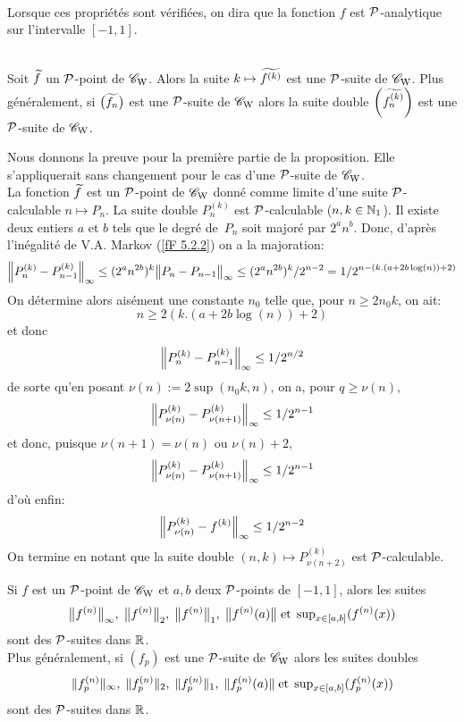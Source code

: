 \begin{fdefinition}  \label{f529} 
~\\ 
Lorsque ces propriétés sont vérifiées, on dira que la fonction $f$ est  
${\cal P}$-analytique sur l'intervalle  $[-1,1]$.
 \end{fdefinition}

\begin{ftheorem} \label{f5210} ~\\
Soit $\widetilde f$ un  ${\cal P}$-point de  ${{{\mathscr C}}_{\rm W}}$.  Alors  la suite $k \mapsto \widetilde{f^{(k)}}$   est  une  ${\cal P}$-suite de  ${{{\mathscr C}}_{\rm W}}$.  
Plus généralement, si $\big(\widetilde{f_n}\big)$ est une ${\cal P}$-suite de  ${{{\mathscr C}}_{\rm W}}$  alors la suite 
double $\bigg(\widetilde{f_n^{(k)}}\bigg)$ est une ${\cal P}$-suite de  ${{{\mathscr C}}_{\rm W}}$.
\end{ftheorem}

\proof Nous donnons la preuve pour la première partie de la proposition. Elle 
s'appliquerait sans changement pour le cas d'une ${\cal P}$-suite de ${{{\mathscr C}}_{\rm W}}$. \\
La fonction $\widetilde f$ est un ${\cal P}$-point de ${{{\mathscr C}}_{\rm W}}$ donné comme limite d'une suite   ${\cal P}$-calculable $n \mapsto P_n$. 
La suite double  $P_n^{(k)}$  est  ${\cal P}$-calculable  ($n,k\in\mathbb {N}_1$).  
Il existe deux entiers  $a$  et  $b$  tels que le degré de~$P_n$ soit majoré par  $2^a n^b$.  
Donc,  d'après l'inégalité de V.A. Markov  (\ref{fF 5.2.2})  on a la majoration:
\[
\Big\lVert  P_n^{(k)} - P_{n-1}^{(k)}  \Big\rVert_\infty \leq (2^an^{2b})^k \big\lVert  P_n - P_{n-1}  \big\rVert_{\infty} \leq (2^an^{2b})^k /2^{n-2} = 1/2^{n-(k.(a+2b \log(n))+2)}
\]
On détermine alors aisément une constante  $n_0$  telle que, pour 
$n \geq 2n_0k$, on ait:   $$n \geq 2(k.(a+2b \log(n))+2)$$ 
et donc  
\[
\Big\lVert  P_n^{(k)} - P_{n-1}^{(k)}  \Big\rVert_\infty \leq 1/2^{n/2}
\] 
de sorte qu'en posant  $\nu(n) := 2 \sup(n_0k,n)$,  on a, pour 
$q \geq \nu(n),$  
\[
\Big\lVert  P_{\nu(n)}^{(k)} - P_{\nu(n+1)}^{(k)}  \Big\rVert_\infty \leq 1/2^{n-1}
\]
et donc, puisque  
$\nu(n+1) = \nu(n)$ ou  $\nu(n)+2,$ 
\[
\Big\lVert  P_{\nu(n)}^{(k)} - P_{\nu(n+1)}^{(k)}  \Big\rVert_\infty \leq 1/2^{n-1}
\]
 d'où enfin:   
\[
\Big\lVert  P_{\nu(n)}^{(k)} - f^{(k)}  \Big\rVert_\infty \leq 1/2^{n-2}
\]
On termine en notant que la suite double  $(n,k) \mapsto P_{\nu(n+2)}^{(k)}$  
est  ${\cal P}$-calculable.    \eop

\begin{fcorollary} \label{f5211}
Si $f$ est un  ${\cal P}$-point de  ${{{\mathscr C}}_{\rm W}}$   et   $a, b$   deux  ${\cal P}$-points de  
$[-1,1]$, alors les suites  
\[
\big\lVert f^{(n)}  \big\rVert_{\infty}, \; \big\lVert f^{(n)}  \big\rVert_2, \; \big\lVert f^{(n)}  \big\rVert_1, \; \big\lVert f^{(n)}(a) \big\rVert \;\hbox{et} \; \sup\nolimits_{x \in [a,b]} (f^{(n)}(x))
\]
sont des ${\cal P}$-suites dans  $\mathbb {R}$.\\
Plus généralement, si $(f_p)$ est une ${\cal P}$-suite de  ${{{\mathscr C}}_{\rm W}}$  alors les suites 
doubles  
\[
\lVert f_p^{(n)} \rVert_\infty, \; \lVert f_p^{(n)}  \rVert_2, \; \lVert f_p^{(n)}  \rVert_1, \; \lVert f_p^{(n)}(a) \rVert \; \hbox{et} \; \sup\nolimits_{x \in [a,b]} (f_p^{(n)}(x))
\]
sont des ${\cal P}$-suites dans  $\mathbb {R}$.
\end{fcorollary}

